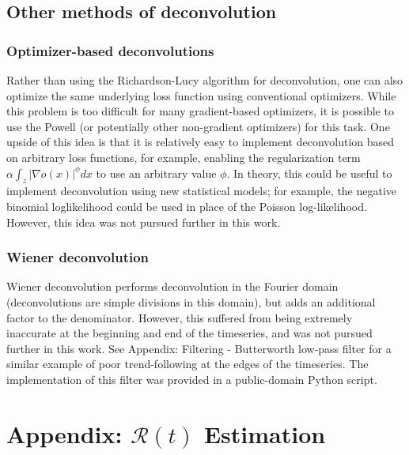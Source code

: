 \documentclass{article}
\newcommand{\nR}{\mathcal{R}}
\begin{document}
\subsection{Other methods of deconvolution}
\subsubsection{Optimizer-based deconvolutions}
Rather than using the Richardson-Lucy algorithm for deconvolution, one can also optimize the same underlying loss function using conventional optimizers. While this problem is too difficult for many gradient-based optimizers, it is possible to use the Powell (or potentially other non-gradient optimizers) for this task. One upside of this idea is that it is relatively easy to implement deconvolution based on arbitrary loss functions, for example, enabling the regularization term $\alpha \int_z |\nabla o(x)|^\phi dx$ to use an arbitrary value $\phi$. In theory, this could be useful to implement deconvolution using  new statistical models; for example, the negative binomial loglikelihood could be used in place of the Poisson log-likelihood. However, this idea was not pursued further in this work.

\subsubsection{Wiener deconvolution}
Wiener deconvolution performs deconvolution in the Fourier domain (deconvolutions are simple divisions in this domain), but adds an additional factor to the denominator. However, this suffered from being extremely inaccurate at the beginning and end of the timeseries, and was not pursued further in this work. See Appendix: Filtering - Butterworth low-pass filter for a similar example of poor trend-following at the edges of the timeseries. The implementation of this filter was provided in a public-domain Python script. \cite{wienerimplementation}

\section{Appendix: $\nR(t)$ Estimation}
\end{document}

